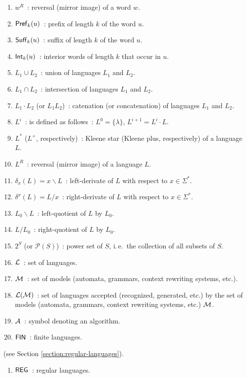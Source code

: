\begin{enumerate}[]
\item $w^R$\ : reversal (mirror image) of a word $w$.
\item $\textup{\sf Pref\/}_k(u)$\ : prefix of length $k$ of the word $u$.
\item $\textup{\sf Suff\/}_k(u)$\ : suffix of length $k$ of the word $u$.
\item $\textup{\sf Int\/}_k(u)$\ : interior words of length $k$ that occur in $u$.
\item $L_1 \cup L_2$\ : union of languages $L_1$ and $L_2$.
\item $L_1 \cap L_2$\ : intersection of languages $L_1$ and $L_2$.
\item $L_1 \cdot L_2$ (or $L_1 L_2$)\ : catenation (or concatenation) of languages $L_1$ and $L_2$.
\item $L^i$\ : is defined as follows\ : $L^0 = \{\lambda\}$, $L^{i+1} = L^i \cdot L$.
\item $L^*$ ($L^+$, respectively)\ : Kleene star (Kleene plus, respectively) of a language $L$.
\item $L^R$\ : reversal (mirror image) of a language $L$.
\item $\delta_x(L) = x \backslash L$\ : left-derivate of $L$ with respect to $x \in \Sigma^*$.
\item $\delta^x(L) = L / x$\ : right-derivate of $L$ with respect to $x \in \Sigma^*$.
\item $L_0 \backslash L$\ : left-quotient of $L$ by $L_0$.
\item $L / L_0$\ : right-quotient of $L$ by $L_0$.
\item $2^S$ (or $\mathcal{P}(S)$)\ : power set of $S$, i.\,e.\ the collection of all subsets of $S$.
\item $\textup{\sf $\mathcal{L}$}$\ : set of languages.
\item $\textup{\sf $\mathcal{M}$}$\ : set of models (automata, grammars, context rewriting systems, etc.).
\item ${\cal L}(\textup{\sf $\mathcal{M}$})$\ : set of languages accepted (recognized, generated, etc.) by the set of models (automata, grammars, context rewriting systems, etc.) $\textup{\sf $\mathcal{M}$}$.
\item $\textup{\sf $\mathcal{A}$}$\ : symbol denoting an algorithm.
\item $\textup{\sf FIN}$\ : finite languages.
\end{enumerate}

 (see Section \ref{section:regular-languages}).

\begin{enumerate}[]
\item $\textup{\sf REG}$\ : regular languages.
\end{enumerate}

